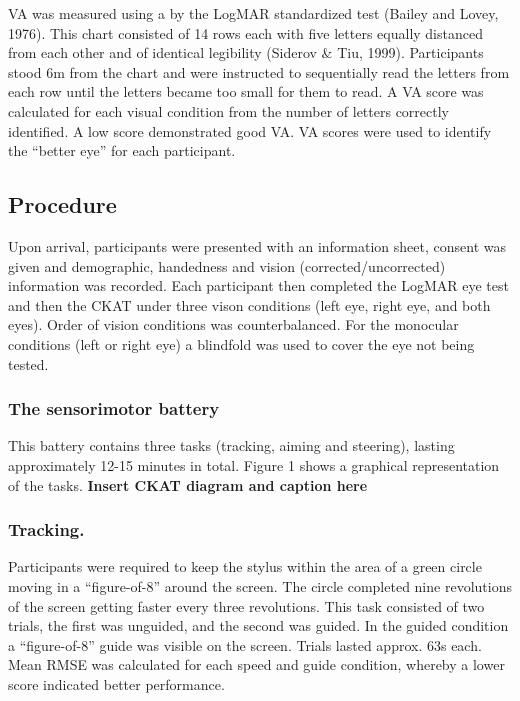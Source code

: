 \documentclass[
  english,
  man,floatsintext]{apa6}
\begin{document}
VA was measured using a by the LogMAR standardized test (Bailey and Lovey, 1976).
This chart consisted of 14 rows each with five letters equally distanced from each other and of identical legibility (Siderov \& Tiu, 1999).
Participants stood 6m from the chart and were instructed to sequentially read the letters from each row until the letters became too small for them to read.
A VA score was calculated for each visual condition from the number of letters correctly identified.
A low score demonstrated good VA. VA scores were used to identify the \enquote{better eye} for each participant.

\hypertarget{procedure}{%
\subsection{Procedure}\label{procedure}}

Upon arrival, participants were presented with an information sheet, consent was given and demographic, handedness and vision (corrected/uncorrected) information was recorded.
Each participant then completed the LogMAR eye test and then the CKAT under three vison conditions (left eye, right eye, and both eyes).
Order of vision conditions was counterbalanced. For the monocular conditions (left or right eye) a blindfold was used to cover the eye not being tested.

\hypertarget{the-sensorimotor-battery}{%
\subsubsection{The sensorimotor battery}\label{the-sensorimotor-battery}}

This battery contains three tasks (tracking, aiming and steering), lasting approximately 12-15 minutes in total. Figure 1 shows a graphical representation of the tasks.
\textbf{Insert CKAT diagram and caption here}

\hypertarget{tracking.}{%
\subsubsection{Tracking.}\label{tracking.}}

Participants were required to keep the stylus within the area of a green circle moving in a \enquote{figure-of-8} around the screen.
The circle completed nine revolutions of the screen getting faster every three revolutions.
This task consisted of two trials, the first was unguided, and the second was guided.
In the guided condition a \enquote{figure-of-8} guide was visible on the screen.
Trials lasted approx. 63s each.
Mean RMSE was calculated for each speed and guide condition, whereby a lower score indicated better performance.
\end{document}
